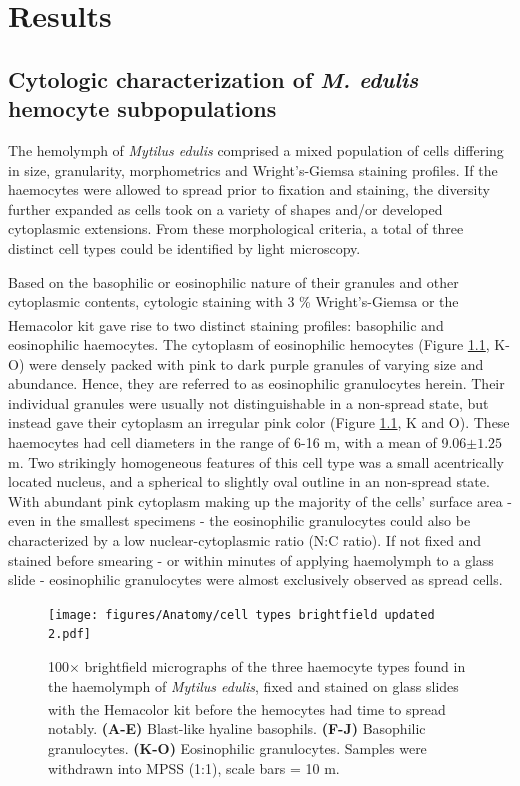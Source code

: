 \chapter{Results}
\label{chap:results}
\section{Cytologic characterization of \emph{M. edulis} hemocyte subpopulations}
The hemolymph of \emph{Mytilus edulis} comprised a mixed population of cells differing in size, granularity, morphometrics and Wright's-Giemsa staining profiles. If the haemocytes were allowed to spread prior to fixation and staining, the diversity further expanded as cells took on a variety of shapes and/or developed cytoplasmic extensions. From these morphological criteria, a total of three distinct cell types could be identified by light microscopy.

Based on the basophilic or eosinophilic nature of their granules and other cytoplasmic contents, cytologic staining with 3 \% Wright's-Giemsa or the Hemacolor\textsuperscript{\textregistered} kit gave rise to two distinct staining profiles: basophilic and eosinophilic haemocytes. The cytoplasm of eosinophilic hemocytes (Figure \ref{fig:celltypes}, K-O) were densely packed with pink to dark purple granules of varying size and abundance. Hence, they are referred to as eosinophilic granulocytes herein. Their individual granules were usually not distinguishable in a non-spread state, but instead gave their cytoplasm an irregular pink color (Figure \ref{fig:celltypes}, K and O). These haemocytes had cell diameters in the range of 6-16 \micro m, with a mean of 9.06$\pm1.25$ \micro m. Two strikingly homogeneous features of this cell type was a small acentrically located nucleus, and a spherical to slightly oval outline in an non-spread state. With abundant pink cytoplasm making up the majority of the cells' surface area - even in the smallest specimens - the eosinophilic granulocytes could also be characterized by a low nuclear-cytoplasmic ratio (N:C ratio). If not fixed and stained before smearing - or within minutes of applying haemolymph to a glass slide - eosinophilic granulocytes were almost exclusively observed as spread cells. 

\begin{figure}[!ht]
    \centering
    \texttt{[image: figures/Anatomy/cell types brightfield updated 2.pdf]}
    \caption{100$\times$ brightfield micrographs of the three haemocyte types found in the haemolymph of \emph{Mytilus edulis}, fixed and stained on glass slides with the Hemacolor\textsuperscript{\textregistered} kit before the hemocytes had time to spread notably. \textbf{(A-E)} Blast-like hyaline basophils. \textbf{(F-J)} Basophilic granulocytes. \textbf{(K-O)} Eosinophilic granulocytes. Samples were withdrawn into MPSS (1:1), scale bars = 10 \micro m.}
    \label{fig:celltypes}
\end{figure}

